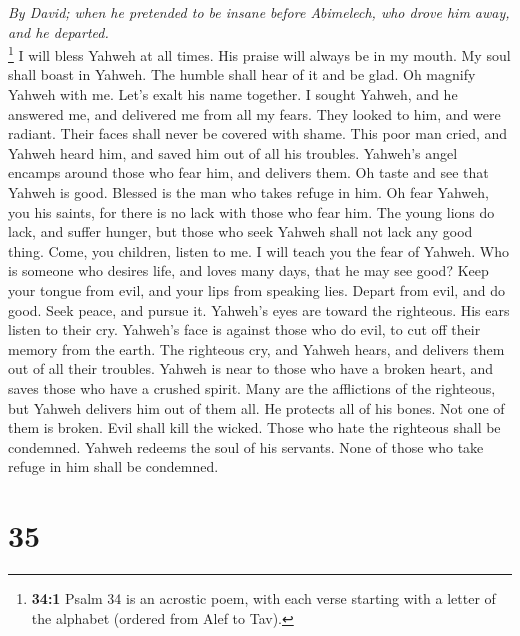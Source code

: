 \emph{By David; when he pretended to be insane before Abimelech, who
drove him away, and he departed.}\\
 \footnote{\textbf{34:1} Psalm 34 is an acrostic poem,
  with each verse starting with a letter of the alphabet (ordered from
  Alef to Tav).} I will bless Yahweh at all times. His praise will
always be in my mouth.  My soul shall boast in Yahweh. The
humble shall hear of it and be glad.  Oh magnify Yahweh
with me. Let's exalt his name together.  I sought Yahweh,
and he answered me, and delivered me from all my fears. 
They looked to him, and were radiant. Their faces shall never be covered
with shame.  This poor man cried, and Yahweh heard him,
and saved him out of all his troubles.  Yahweh's angel
encamps around those who fear him, and delivers them.  Oh
taste and see that Yahweh is good. Blessed is the man who takes refuge
in him.  Oh fear Yahweh, you his saints, for there is no
lack with those who fear him.  The young lions do lack,
and suffer hunger, but those who seek Yahweh shall not lack any good
thing.  Come, you children, listen to me. I will teach
you the fear of Yahweh.  Who is someone who desires life,
and loves many days, that he may see good?  Keep your
tongue from evil, and your lips from speaking lies. 
Depart from evil, and do good. Seek peace, and pursue it.
 Yahweh's eyes are toward the righteous. His ears listen
to their cry.  Yahweh's face is against those who do
evil, to cut off their memory from the earth.  The
righteous cry, and Yahweh hears, and delivers them out of all their
troubles.  Yahweh is near to those who have a broken
heart, and saves those who have a crushed spirit.  Many
are the afflictions of the righteous, but Yahweh delivers him out of
them all.  He protects all of his bones. Not one of them
is broken.  Evil shall kill the wicked. Those who hate
the righteous shall be condemned.  Yahweh redeems the
soul of his servants. None of those who take refuge in him shall be
condemned.

\hypertarget{section-34}{%
\section{35}\label{section-34}}

